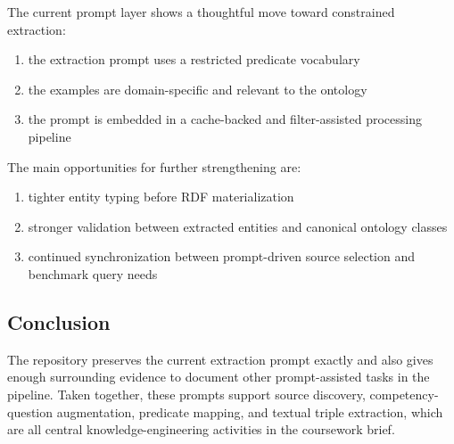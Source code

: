 \documentclass[
  11pt,
  a4paper,
]{article}
\providecommand{\tightlist}{%
  \setlength{\itemsep}{0pt}\setlength{\parskip}{0pt}}
\begin{document}
The current prompt layer shows a thoughtful move toward constrained
extraction:

\begin{enumerate}
\def\labelenumi{\arabic{enumi}.}
\tightlist
\item
  the extraction prompt uses a restricted predicate vocabulary
\item
  the examples are domain-specific and relevant to the ontology
\item
  the prompt is embedded in a cache-backed and filter-assisted
  processing pipeline
\end{enumerate}

The main opportunities for further strengthening are:

\begin{enumerate}
\def\labelenumi{\arabic{enumi}.}
\tightlist
\item
  tighter entity typing before RDF materialization
\item
  stronger validation between extracted entities and canonical ontology
  classes
\item
  continued synchronization between prompt-driven source selection and
  benchmark query needs
\end{enumerate}

\subsection{Conclusion}\label{conclusion}

The repository preserves the current extraction prompt exactly and also
gives enough surrounding evidence to document other prompt-assisted
tasks in the pipeline. Taken together, these prompts support source
discovery, competency-question augmentation, predicate mapping, and
textual triple extraction, which are all central knowledge-engineering
activities in the coursework brief.
\end{document}
